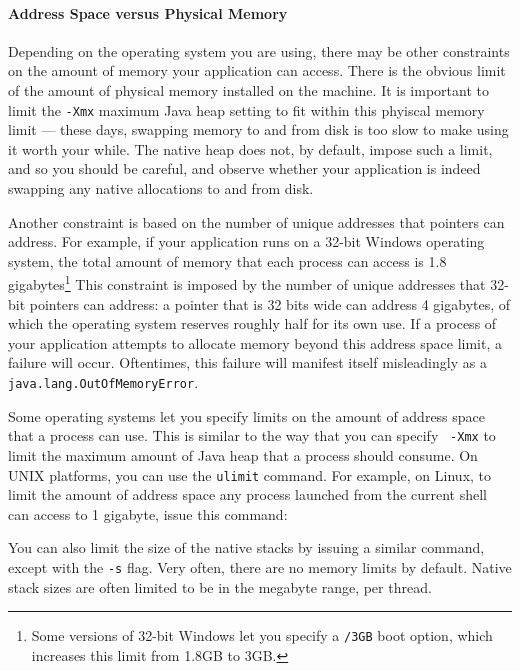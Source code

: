 

\paragraph{Address Space versus Physical Memory}
Depending on the operating system you are using, there may be other constraints
on the amount of memory your application can access. There is the obvious limit
of the amount of physical memory installed on the machine. It is important to
limit the {\tt -Xmx} maximum Java heap setting to fit within this phyiscal
memory limit --- these days, swapping memory to and from disk is too slow to
make using it worth your while. The native heap does not, by default, impose
such a limit, and so you should be careful, and observe whether your application
is indeed swapping any native allocations to and from disk.

Another constraint is based on the number of unique addresses that pointers can
address. For example, if your application runs on a 32-bit Windows operating
system, the total amount of memory that each process can access is 1.8
gigabytes\footnote{Some versions of 32-bit Windows let you specify a {\tt /3GB}
boot option, which increases this limit from 1.8GB to 3GB.} This constraint is
imposed by the number of unique addresses that 32-bit pointers can address: a
pointer that is 32 bits wide can address 4 gigabytes, of which the operating
system reserves roughly half for its own use. If a process of your application
attempts to allocate memory beyond this address space limit, a failure will
occur. Oftentimes, this failure will manifest itself misleadingly as a {\tt
java.lang.OutOfMemoryError}.

Some operating systems let you specify limits on the amount of address space
that a process can use. This is similar to the way that you can specify {\tt
-Xmx} to limit the maximum amount of Java heap that a process should consume. On
UNIX platforms, you can use the {\tt ulimit} command. For example, on Linux, to
limit the amount of address space any process launched from the current shell
can access to 1 gigabyte, issue this command:
\begin{shortlisting}
\end{shortlisting}
You can also limit the size of the native stacks by issuing a similar command,
except with the {\tt -s} flag. Very often, there are no memory
limits by default. Native stack sizes are often limited to be in the megabyte
range, per thread.

